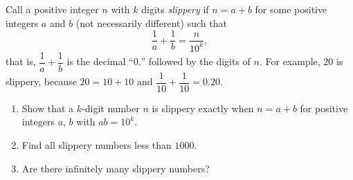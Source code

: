 Call a positive integer $n$ with $k$ digits \emph{slippery} if $n=a+b$ for some positive integers $a$ and $b$ (not necessarily different) such that
\[
\dfrac{1}{a}+\dfrac{1}{b}=\dfrac{n}{10^k},
\]
that is, $\dfrac{1}{a}+\dfrac{1}{b}$ is the decimal ``$0.$'' followed by the digits of $n$. For example, $20$ is slippery, because $20=10+10$ and $\dfrac{1}{10}+\dfrac{1}{10}=0.20$.
\begin{enumerate}
\item[(a)] Show that a $k$-digit number $n$ is slippery exactly when $n=a+b$ for positive integers $a$, $b$ with $ab=10^k$.
\item[(b)] Find all slippery numbers less than $1000$.
\item[(c)] Are there infinitely many slippery numbers?
\end{enumerate}
